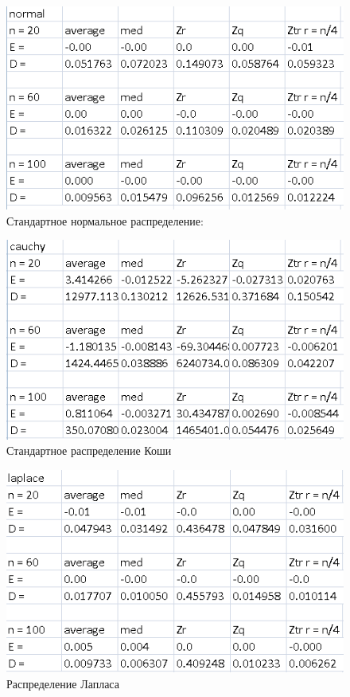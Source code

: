 \documentclass[a4]{article}
\begin{document}
\begin{figure}[H]
  \centering
  \includegraphics[width=\textwidth]{normalFix.png}
  \caption{Стандартное нормальное распределение:}
\end{figure}

\begin{figure}[H]
  \centering
  \includegraphics[width=\textwidth]{cauchy.png} 
  \caption{Стандартное распределение Коши}
\end{figure}

\begin{figure}[H]
  \centering
  \includegraphics[width=\textwidth]{laplaceFix.png} 
  \caption{Распределение Лапласа}
\end{figure}
\end{document}
